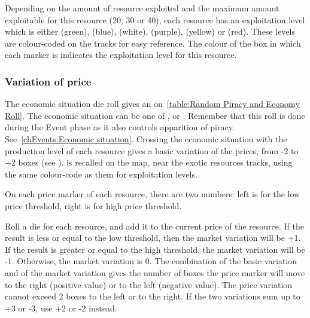 \aparag Depending on the amount of resource exploited and the maximum amount
exploitable for this resource (20, 30 or 40), each resource has an
exploitation level which is either  (green),  (blue),
 (white),  (purple),  (yellow) or
 (red).
\bparag These levels are colour-coded on the tracks for easy reference.
\bparag The colour of the box in which each  marker
is indicates the exploitation level for this resource.


\subsubsection{Variation of price}

\bparag The economic situation die roll gives an 
on~\ref{table:Random Piracy and Economy Roll}. The economic situation can be
one of ,  or .
\bparag Remember that this roll is done during the Event phase as it also
controls apparition of piracy. See~\ref{chEvents:Economic situation}.
\bparag Crossing the economic situation with the production level of each
resource gives a basic variation of the prices, from -2 to +2 boxes (see
).
\bparag {} is recalled on the \ROTW
map, near the exotic resources tracks, using the same colour-code as them for
exploitation levels.


\aparag On each price marker of each resource, there are two numbers: left is
for the low price threshold, right is for high price threshold.

 Roll a die for each resource, and add it to the
current price of the resource. If the result is less or equal to the low
threshold, then the market variation will be +1. If the result is greater or
equal to the high threshold, the market variation will be -1. Otherwise, the
market variation is 0.
\bparag The combination of the basic variation and of the market variation
gives the number of boxes the price marker will move to the right (positive
value) or to the left (negative value).
\bparag The price variation cannot exceed 2 boxes to the left or to the
right. If the two variations sum up to +3 or -3, use +2 or -2 instead.

